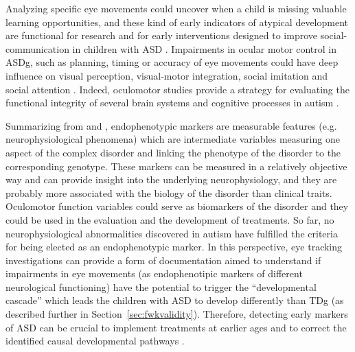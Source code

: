 Analyzing specific eye movements could uncover when a child is missing valuable learning opportunities, and these kind of early indicators of atypical development are functional for research and for early interventions designed to improve social-communication in children with ASD \citep{birmingham2017gazeselection}. Impairments in ocular motor control in ASDg, such as planning, timing or accuracy of eye movements could have deep influence on visual perception, visual-motor integration, social imitation and social attention \citep{brenner2007visualsearch,johnson2016review}. Indeed, oculomotor studies provide a strategy for evaluating the functional integrity of several brain systems and cognitive processes in autism \citep{takarae2004smoothpursuit}.

Summarizing from \cite{kemner2004smoothpursuit} and \cite{smyrnis2008guidelines}, endophenotypic markers are measurable features (e.g. neurophysiological phenomena) which are intermediate variables measuring one aspect of the complex disorder and linking the phenotype of the disorder to the corresponding genotype. These markers can be measured in a relatively objective way and can provide insight into the underlying neurophysiology, and they are probably more associated with the biology of the disorder than clinical traits. Oculomotor function variables could serve as biomarkers of the disorder and they could be used in the evaluation and the development of treatments. So far, no neurophysiological abnormalities discovered in autism have fulfilled the criteria for being elected as an endophenotypic marker.
In this perspective, eye tracking investigations can provide a form of documentation aimed to understand if impairments in eye movements (as endophenotipic markers of different neurological functioning) have the potential to trigger the “developmental cascade” \citep{towie2016screening}  which leads the children with ASD to develop differently than TDg (as described further in Section~\ref{sec:fwkvalidity}). Therefore, detecting early markers of ASD can be crucial to implement treatments at earlier ages and to correct the identified causal developmental pathways \citep{young2009gazechildren}.

